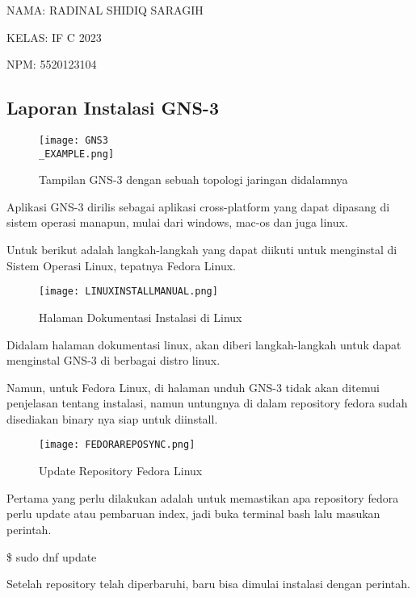 \documentclass[12pt, a4paper]{article}
\date{}
\begin{document}
    NAMA: RADINAL SHIDIQ SARAGIH

    KELAS: IF C 2023

    NPM: 5520123104

  \begin{center}
    \section*{Laporan Instalasi GNS-3}
  \end{center}

      \begin{figure}[h]
          \centering
          \texttt{[image: GNS3\\\_EXAMPLE.png]}
          \caption{\small{Tampilan GNS-3 dengan sebuah topologi jaringan didalamnya}}
      \end{figure}


      Aplikasi GNS-3 dirilis sebagai aplikasi cross-platform yang dapat
      dipasang di sistem operasi manapun, mulai dari windows, mac-os dan
      juga linux.

      Untuk berikut adalah langkah-langkah yang dapat diikuti untuk menginstal
      di Sistem Operasi Linux, tepatnya Fedora Linux.

      \begin{figure}[h]
          \centering
          \texttt{[image: LINUXINSTALLMANUAL.png]}
          \caption{\small{Halaman Dokumentasi Instalasi di Linux}}
      \end{figure}

      Didalam halaman dokumentasi linux, akan diberi langkah-langkah untuk 
      dapat menginstal GNS-3 di berbagai distro linux.

      Namun, untuk Fedora Linux, di halaman unduh GNS-3 tidak akan ditemui penjelasan
      tentang instalasi, namun untungnya di dalam repository fedora sudah disediakan
      binary nya siap untuk diinstall.

      \begin{figure}[h]
          \centering
          \texttt{[image: FEDORAREPOSYNC.png]}
          \caption{\small{Update Repository Fedora Linux}}
      \end{figure}

      Pertama yang perlu dilakukan adalah untuk memastikan apa repository fedora
      perlu update atau pembaruan index, jadi buka terminal bash lalu
      masukan perintah.
      
      \$ sudo dnf update

      Setelah repository telah diperbaruhi, baru bisa dimulai instalasi dengan
      perintah.
\end{document}
